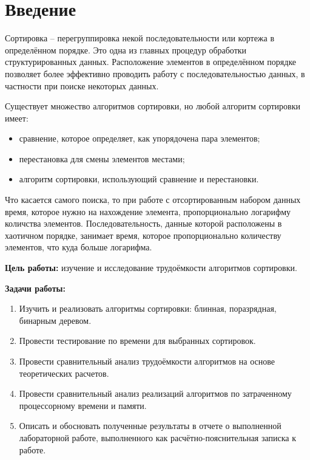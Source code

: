 \chapter*{Введение}

Сортировка -- перегруппировка некой последовательности или кортежа в определённом порядке. 
Это одна из главных процедур обработки структурированных данных. 
Расположение элементов в определённом порядке позволяет более эффективно проводить работу с последовательностью данных, в частности при поиске некоторых данных. \newline

Существует множество алгоритмов сортировки, но любой алгоритм сортировки имеет:
\begin{itemize}
	\item сравнение, которое определяет, как упорядочена пара элементов;
    \item перестановка для смены элементов местами;
    \item алгоритм сортировки, использующий сравнение и перестановки. \newline
\end{itemize}

Что касается самого поиска, то при работе с отсортированным набором данных время, которое нужно на нахождение элемента, пропорционально логарифму количства элементов. Последовательность, данные которой расположены в хаотичном порядке, занимает время, которое пропорционально количеству элементов, что куда больше логарифма. \newline

\textbf{Цель работы:} изучение и исследование трудоёмкости алгоритмов сортировки. \newline

\textbf{Задачи работы:}
\begin{enumerate}
	\item Изучить и реализовать алгоритмы сортировки: блинная, поразрядная, бинарным деревом.
    \item Провести тестирование по времени для выбранных сортировок.
    \item Провести сравнительный анализ трудоёмкости алгоритмов на основе теоретических расчетов.
    \item Провести сравнительный анализ реализаций алгоритмов по затраченному процессорному времени и памяти.
	\item Описать и обосновать полученные результаты в отчете о выполненной лабораторной работе, выполненного как расчётно-пояснительная записка к работе.
\end{enumerate}